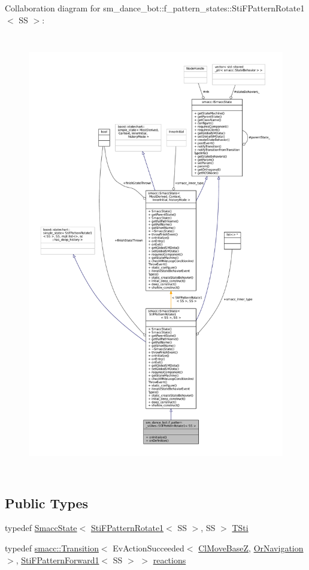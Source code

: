Collaboration diagram for sm\+\_\+dance\+\_\+bot\+:\+:f\+\_\+pattern\+\_\+states\+:\+:Sti\+F\+Pattern\+Rotate1$<$ SS $>$\+:
\nopagebreak
\begin{figure}[H]
\begin{center}
\leavevmode
\includegraphics[height=550pt]{structsm__dance__bot_1_1f__pattern__states_1_1StiFPatternRotate1__coll__graph}
\end{center}
\end{figure}
\subsection*{Public Types}
\begin{DoxyCompactItemize}
\item 
typedef \hyperlink{classSmaccState}{Smacc\+State}$<$ \hyperlink{structsm__dance__bot_1_1f__pattern__states_1_1StiFPatternRotate1}{Sti\+F\+Pattern\+Rotate1}$<$ SS $>$, SS $>$ \hyperlink{structsm__dance__bot_1_1f__pattern__states_1_1StiFPatternRotate1_a3fafd58718e0f6aada113795bdf2c841}{T\+Sti}
\item 
typedef \hyperlink{classsmacc_1_1Transition}{smacc\+::\+Transition}$<$ Ev\+Action\+Succeeded$<$ \hyperlink{classmove__base__z__client_1_1ClMoveBaseZ}{Cl\+Move\+BaseZ}, \hyperlink{classsm__dance__bot_1_1OrNavigation}{Or\+Navigation} $>$, \hyperlink{structsm__dance__bot_1_1f__pattern__states_1_1StiFPatternForward1}{Sti\+F\+Pattern\+Forward1}$<$ SS $>$ $>$ \hyperlink{structsm__dance__bot_1_1f__pattern__states_1_1StiFPatternRotate1_a0152d2d4527589122e6f263a4d8903f3}{reactions}
\end{DoxyCompactItemize}
